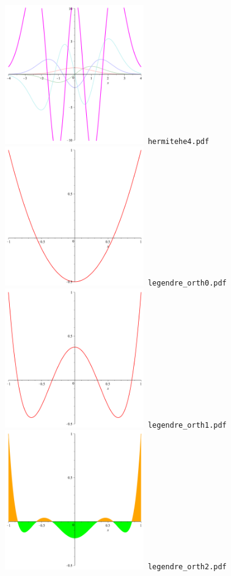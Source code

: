 \documentclass[a4paper]{amsart}
\begin{document}
\includegraphics[width=6cm]{hermitehe4.pdf}\verb+ hermitehe4.pdf+\\
\includegraphics[width=6cm]{legendre_orth0.pdf}\verb+ legendre_orth0.pdf+\\
\includegraphics[width=6cm]{legendre_orth1.pdf}\verb+ legendre_orth1.pdf+\\
\includegraphics[width=6cm]{legendre_orth2.pdf}\verb+ legendre_orth2.pdf+\\
\end{document}
